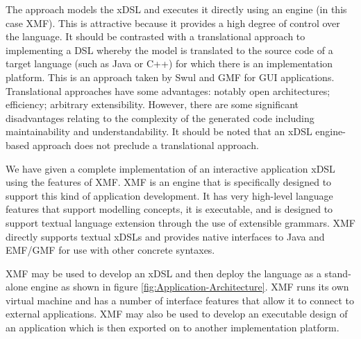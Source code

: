 The approach models the xDSL and executes it directly using an engine
(in this case XMF). This is attractive because it provides a high
degree of control over the language. It should be contrasted with
a translational approach to implementing a DSL whereby the model is
translated to the source code of a target language (such as Java or
C++) for which there is an implementation platform. This is an approach
taken by Swul \cite{SWUL} and GMF \cite{gmf} for GUI applications.
Translational approaches have some advantages: notably open architectures;
efficiency; arbitrary extensibility. However, there are some significant
disadvantages relating to the complexity of the generated code including
maintainability and understandability. It should be noted that an
xDSL engine-based approach does not preclude a translational approach.

We have given a complete implementation of an interactive application
xDSL using the features of XMF. XMF is an engine that is specifically
designed to support this kind of application development. It has very
high-level language features that support modelling concepts, it is
executable, and is designed to support textual language extension
through the use of extensible grammars. XMF directly supports textual
xDSLs and provides native interfaces to Java and EMF/GMF for use with
other concrete syntaxes.

XMF may be used to develop an xDSL and then deploy the language as
a stand-alone engine as shown in figure \ref{fig:Application-Architecture}.
XMF runs its own virtual machine and has a number of interface features
that allow it to connect to external applications. XMF may also be
used to develop an executable design of an application which is then
exported on to another implementation platform.